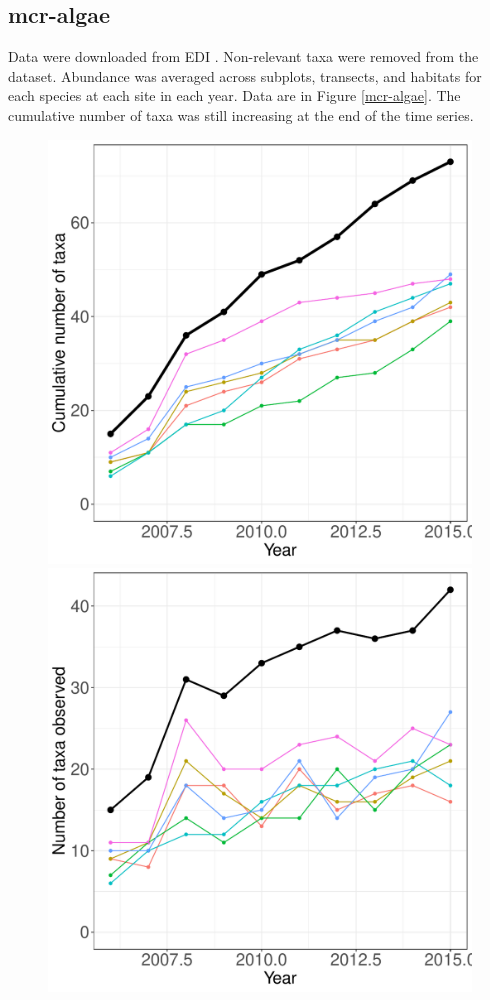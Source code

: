 \documentclass[11pt, oneside]{article}
\begin{document}
\subsection {mcr-algae}
Data were downloaded from EDI \citep{mcr-algae}.
Non-relevant taxa were removed from the dataset.
Abundance was averaged across subplots, transects, and habitats for each species at each site in each year.
Data are in Figure \ref{mcr-algae}.
The cumulative number of taxa was still increasing at the end of the time series.
\begin{figure}[h!]
\centering
\includegraphics[scale = 0.4]{mcr-algae-castorani_species_accumulation_curve.pdf}
\includegraphics[scale = 0.4]{mcr-algae-castorani_num_taxa_over_time.pdf}

\end{figure}
\end{document}
